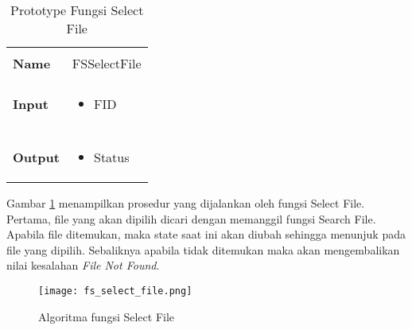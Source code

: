 \documentclass[a4paper, 12pt]{report}
\begin{document}
\begin{table}[h]
  \centering
  \begin{tabular}{p{2cm} p{8cm}}
    \hline\\
    {\bf Name} & FSSelectFile\\
    \hline\\
    {\bf Input} & 
    \begin{itemize}[noitemsep,topsep=0pt,parsep=0pt,partopsep=0pt]
    \item FID
    \end{itemize}
    \\
    \hline\\
    {\bf Output} & 
    \begin{itemize}[noitemsep,topsep=0pt,parsep=0pt,partopsep=0pt]
    \item Status
    \end{itemize}
    \\
    \hline
  \end{tabular}
  \caption{Prototype Fungsi Select File}
  \label{tbl-select-file}
\end{table}




Gambar \ref{fig-select-file} menampilkan prosedur yang dijalankan oleh fungsi Select File. Pertama, file yang akan dipilih dicari dengan memanggil fungsi Search File. Apabila file ditemukan, maka state saat ini akan diubah sehingga menunjuk pada file yang dipilih. Sebaliknya apabila tidak ditemukan maka akan mengembalikan nilai kesalahan {\em File Not Found}.

\begin{figure}
\centering
\texttt{[image: fs\_select\_file.png]}
\caption{Algoritma fungsi Select File}
\label{fig-select-file}
\end{figure}
\end{document}
